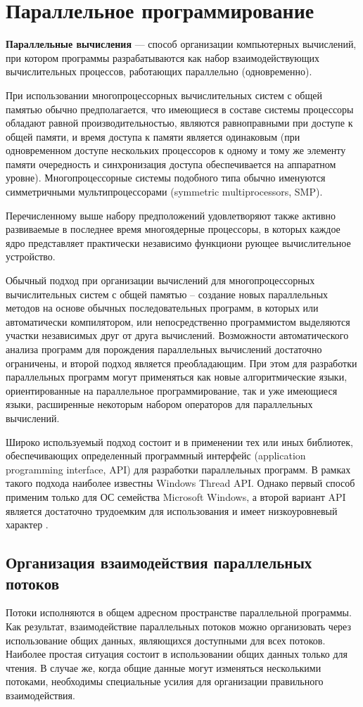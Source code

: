 \documentclass[12pt]{report}
\begin{document}
\section{Параллельное программирование}
\textbf{Параллельные вычисления} — способ организации компьютерных вычислений, при котором программы разрабатываются как набор взаимодействующих вычислительных процессов, работающих параллельно (одновременно). 

При использовании многопроцессорных вычислительных систем с общей памятью обычно предполагается, что имеющиеся в составе системы процессоры обладают равной производительностью, являются равноправными при доступе к общей памяти, и время доступа к памяти является одинаковым (при одновременном доступе нескольких процессоров к одному и тому же элементу памяти очередность и синхронизация доступа обеспечивается на аппаратном уровне). Многопроцессорные системы подобного типа обычно именуются симметричными мультипроцессорами (symmetric multiprocessors, SMP).

Перечисленному выше набору предположений удовлетворяют также активно развиваемые в последнее время многоядерные процессоры, в которых каждое ядро представляет практически независимо функциони рующее вычислительное устройство.

Обычный подход при организации вычислений для многопроцессорных вычислительных систем с общей памятью – создание новых параллельных методов на основе обычных последовательных программ, в которых или автоматически компилятором, или непосредственно программистом выделяются участки независимых друг от друга вычислений. Возможности автоматического анализа программ для порождения параллельных вычислений достаточно ограничены, и второй подход является преобладающим. При этом для разработки параллельных программ могут применяться как новые алгоритмические языки, ориентированные на параллельное программирование, так и уже имеющиеся языки, расширенные некоторым набором операторов для параллельных вычислений.

Широко используемый подход состоит и в применении тех или иных библиотек, обеспечивающих определенный программный интерфейс (application programming interface, API) для разработки параллельных программ. В рамках такого подхода наиболее известны Windows Thread API. Однако первый способ применим только для ОС семейства Microsoft Windows, а второй вариант API является достаточно трудоемким для использования и имеет низкоуровневый характер \cite{Barkalov}.

\subsection{Организация взаимодействия параллельных потоков}
Потоки исполняются в общем адресном пространстве параллельной программы. Как результат, взаимодействие параллельных потоков можно организовать через использование общих данных, являющихся доступными для всех потоков. Наиболее простая ситуация состоит в использовании общих данных только для чтения. В случае же, когда общие данные могут изменяться несколькими потоками, необходимы специальные усилия для организации правильного взаимодействия.
\end{document}
